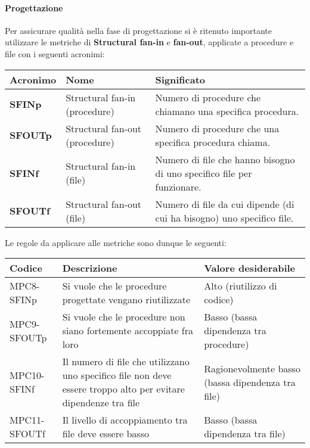 \paragraph{Progettazione}
Per assicurare qualità nella fase di progettazione si è ritenuto importante utilizzare le metriche di \textbf{Structural fan-in} e \textbf{fan-out}, applicate a procedure e file con i seguenti acronimi:
\begin{table}[h!]
\centering
\def\arraystretch{1.5}
\begin{tabular}{ |m{2cm}|m{4cm}|m{8cm}| }
\hline
\rowcolor{lightgray!30}
\textbf{Acronimo} & \textbf{Nome} & \textbf{Significato}\\
\hline
\textbf{SFINp} & Structural fan-in (procedure) & Numero di procedure che chiamano una specifica procedura.\\
\hline
\textbf{SFOUTp} & Structural fan-out (procedure) & Numero di procedure che una specifica procedura chiama.\\
\hline
\textbf{SFINf} & Structural fan-in (file) & Numero di file che hanno bisogno di uno specifico file per funzionare.\\
\hline
\textbf{SFOUTf} & Structural fan-out (file) & Numero di file da cui dipende (di cui ha bisogno) uno specifico file. \\
\hline
\end{tabular}
\end{table}

\newpage
Le regole da applicare alle metriche sono dunque le seguenti:
\begin{table}[h!]
\centering
\def\arraystretch{1.5}
\begin{tabular}{ |>{\centering\arraybackslash}m{4cm}|>{\centering\arraybackslash}m{5.5cm}|>{\centering\arraybackslash}m{5cm}| }
\hline
\rowcolor{black}
\textbf{\color{white} Codice} & \textbf{\color{white} Descrizione} & \textbf{\color{white} Valore desiderabile}\\
\hline
MPC8-SFINp & Si vuole che le procedure progettate vengano riutilizzate & Alto (riutilizzo di codice) \\
\hline
MPC9-SFOUTp & Si vuole che le procedure non siano fortemente accoppiate fra loro & Basso (bassa dipendenza tra procedure) \\
\hline
MPC10-SFINf & Il numero di file che utilizzano uno specifico file non deve essere troppo alto per evitare dipendenze tra file & Ragionevolmente basso (bassa dipendenza tra file) \\
\hline
MPC11-SFOUTf & Il livello di accoppiamento tra file deve essere basso & Basso (bassa dipendenza tra file) \\
\hline
\end{tabular}
\end{table}

